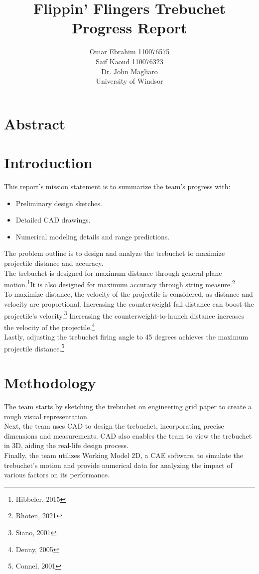 \documentclass[12pt, titlepage]{article}
\title{Flippin' Flingers Trebuchet Progress Report}
\author{Omar Ebrahim 110076575\\Saif Kaoud 110076323\\[10pt] Dr. John Magliaro\\
University of Windsor}
\begin{document}
    \maketitle
    \section{Abstract}
    \newpage
    \tableofcontents
    \listoffigures
    \listoftables \newpage
    \section{Introduction}
    This report's mission statement is to summarize the team's progress with:
    \begin{itemize}
        \item Preliminary design sketches.
        \item Detailed CAD drawings.
        \item Numerical modeling details and range predictions.
    \end{itemize}
    The problem outline is to design and analyze the trebuchet to maximize
    projectile distance and accuracy.\\[10pt]
    The trebuchet is designed for maximum distance through general
    plane motion.\footnote{Hibbeler, 2015}It is also designed for maximum 
    accuracy through string measure.\footnote{Rhoten, 2021}\\[10pt]
    To maximize distance, the velocity of the projectile is considered, as
    distance and velocity are proportional. Increasing the counterweight 
    fall distance can boost the projectile's velocity.\footnote{Siano, 2001}
    Increasing the counterweight-to-launch distance increases the velocity 
    of the projectile.\footnote{Denny, 2005}\\[10pt]
    Lastly, adjusting the trebuchet firing angle to 
    45 degrees achieves the maximum projectile distance.\footnote{Connel, 2001}
    \newpage
    \section{Methodology}
    The team starts by sketching the trebuchet on engineering grid 
    paper to create a rough visual representation.\\[10pt] 
    Next, the team uses CAD to design the trebuchet, incorporating
    precise dimensions and measurements. CAD also enables the team to view the trebuchet in 3D, aiding the real-life design process.\\[10pt]
    Finally, the team utilizes Working Model 2D, a CAE software, to simulate the trebuchet's motion and provide numerical data for analyzing the impact of various factors on its performance.
    \newpage
\end{document}
